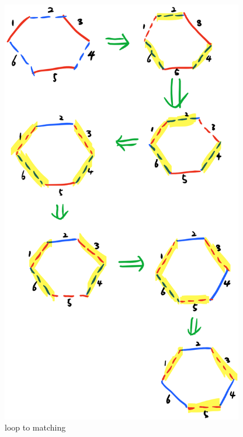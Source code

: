 \documentclass[paper=a4, fontsize=11pt]{scrartcl} %
\numberwithin{figure}{section} %
\numberwithin{table}{section} %
\begin{document}
	\begin{figure}[H]
	\centering
	\includegraphics[width=300pt]{pic4.png}
	\caption*{loop to matching}
	\end{figure}
\end{document}
